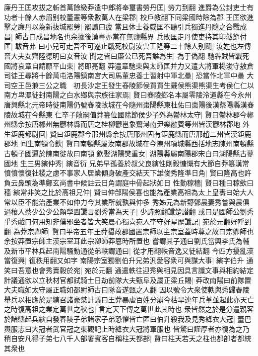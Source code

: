 廉丹王匡攻拔之斬首萬餘級莽遣中郎將奉璽書勞丹匡|{
	勞力到翻}
進爵為公封吏士有功者十餘人赤眉别校董憲等衆數萬人在梁郡|{
	校戶教翻下同梁國時除為郡}
王匡欲進擊之廉丹以為新抜城罷勞|{
	罷讀曰疲}
當且休士養威匡不聽引兵獨進丹隨之合戰成昌|{
	師古曰成昌地名也余據後漢書亦當在無鹽縣界}
兵敗匡走丹使吏持其印韍節付匡|{
	韍音弗}
曰小兒可走吾不可遂止戰死校尉汝雲王隆等二十餘人别鬬|{
	汝姓也左傳晉大夫女齊陸德明曰女音汝}
聞之皆曰廉公已死吾誰為生|{
	為于偽翻}
馳犇賊皆戰死國將哀章自請願平山東|{
	將即亮翻}
莽遣章馳東與太師匡并力又遣大將軍楊浚守敖倉司徒王尋將十餘萬屯洛陽鎮南宮大司馬董忠養士習射中軍北壘|{
	恐當作北軍中壘}
大司空王邑兼三公之職　初長沙定王發生舂陵節侯買買生戴侯熊渠熊渠生考侯仁仁以南方卑濕徙封南陽之白水鄉與宗族往家焉|{
	賢曰舂陵鄉名本屬零陵泠道縣在今永州唐興縣北元帝時徙南陽仍號舂陵故城在今隨州棗陽縣東杜佑曰棗陽後漢蔡陽縣漢舂陵故城在今縣東}
仁卒子敞嗣值莽簒位國除節侯少子外為鬱林太守|{
	賢曰鬱林郡今郴州縣余按唐郴州無鬱林縣而唐之桂柳鬱邕象鷰潯南尹樂融賓等州皆漢鬱林郡地}
外生鉅鹿都尉回|{
	賢曰鉅鹿郡今邢州縣余按唐邢州固有鉅鹿縣而唐邢趙二州皆漢鉅鹿郡地}
囘生南頓令欽|{
	賢曰南頓縣屬汝南郡故城在今陳州項城縣西括地志陳州南頓縣古頓子國逼於陳南徙故曰南頓}
欽娶湖陽樊重女|{
	湖陽縣屬南陽郡宋白曰湖陽縣古蓼國地}
生三男縯仲秀|{
	縯音衍}
兄弟早孤養於叔父良縯性剛毅慷慨有大節自莽簒漢常憤憤懷復社稷之慮不事家人居業傾身破產交結天下雄俊秀隆準日角|{
	賢曰隆高也許負云鼻頭為準鄭玄尚書中候註云日角謂庭中骨起狀如日}
性勤稼穡|{
	賢曰種曰稼歛曰穡}
縯常非笑之比於高祖兄仲|{
	賢曰仲郃陽侯喜也能為產業高祖為太上皇夀曰始大人常以臣不能治產業不如仲力今其業所就孰與仲多}
秀姊元為新野鄧晨妻秀嘗與晨俱過穰人蔡少公少公頗學圖讖言劉秀當為天子|{
	少詩照翻讖楚譛翻}
或曰是國師公劉秀乎秀戲曰何用知非僕邪坐者皆大笑晨心獨喜宛人李守好星歷讖記|{
	宛於元翻好呼到翻}
為莽宗卿師|{
	賢曰平帝五年王莽攝政郡國置宗師以主宗室蓋時尊之故曰宗卿師也余按莽置宗師主漢宗室耳此宗卿師莽簒時所置也}
嘗謂其子通曰劉氏當興李氏為輔及新市平林兵起南陽騷動通從弟軼謂通曰|{
	從才用翻軼音逸又徒結翻}
今四方擾亂漢當復興|{
	復秩用翻又如字}
南陽宗室獨劉伯升兄弟汎愛容衆可與謀大事|{
	縯字伯升}
通笑曰吾意也會秀賣穀於宛|{
	宛於元翻}
通遣軼往迎秀與相見因具言讖文事與相約結定計議通欲以立秋材官都試騎士日劫前隊大夫甄阜及屬正梁丘賜|{
	莽改南陽曰前隊置大夫職如太守屬正職如都尉師古曰隊音遂甄之人翻}
因以號令大衆使軼與秀歸舂陵舉兵以相應於是縯召諸豪桀計議曰王莽暴虐百姓分崩今枯旱連年兵革並起此亦天亡之時復高祖之業定萬世之秋也|{
	言定天下傳之萬世此其時也}
衆皆然之於是分遣親客於諸縣起兵縯自發舂陵子弟諸家子弟恐懼皆亡匿曰伯升殺我及見秀絳衣大冠|{
	董巴輿服志曰大冠者武官冠之東觀記上時絳衣大冠將軍服也}
皆驚曰謹厚者亦復為之乃稍自安凡得子弟七八千人部署賓客自稱柱天都部|{
	賢曰柱天若天之柱也都部者都統其衆也}
